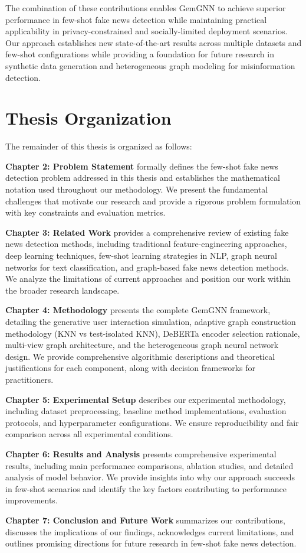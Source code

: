 The combination of these contributions enables GemGNN to achieve superior performance in few-shot fake news detection while maintaining practical applicability in privacy-constrained and socially-limited deployment scenarios. Our approach establishes new state-of-the-art results across multiple datasets and few-shot configurations while providing a foundation for future research in synthetic data generation and heterogeneous graph modeling for misinformation detection.

\section{Thesis Organization}

The remainder of this thesis is organized as follows:

\textbf{Chapter 2: Problem Statement} formally defines the few-shot fake news detection problem addressed in this thesis and establishes the mathematical notation used throughout our methodology. We present the fundamental challenges that motivate our research and provide a rigorous problem formulation with key constraints and evaluation metrics.

\textbf{Chapter 3: Related Work} provides a comprehensive review of existing fake news detection methods, including traditional feature-engineering approaches, deep learning techniques, few-shot learning strategies in NLP, graph neural networks for text classification, and graph-based fake news detection methods. We analyze the limitations of current approaches and position our work within the broader research landscape.

\textbf{Chapter 4: Methodology} presents the complete GemGNN framework, detailing the generative user interaction simulation, adaptive graph construction methodology (KNN vs test-isolated KNN), DeBERTa encoder selection rationale, multi-view graph architecture, and the heterogeneous graph neural network design. We provide comprehensive algorithmic descriptions and theoretical justifications for each component, along with decision frameworks for practitioners.

\textbf{Chapter 5: Experimental Setup} describes our experimental methodology, including dataset preprocessing, baseline method implementations, evaluation protocols, and hyperparameter configurations. We ensure reproducibility and fair comparison across all experimental conditions.

\textbf{Chapter 6: Results and Analysis} presents comprehensive experimental results, including main performance comparisons, ablation studies, and detailed analysis of model behavior. We provide insights into why our approach succeeds in few-shot scenarios and identify the key factors contributing to performance improvements.

\textbf{Chapter 7: Conclusion and Future Work} summarizes our contributions, discusses the implications of our findings, acknowledges current limitations, and outlines promising directions for future research in few-shot fake news detection.

\EndChapter
